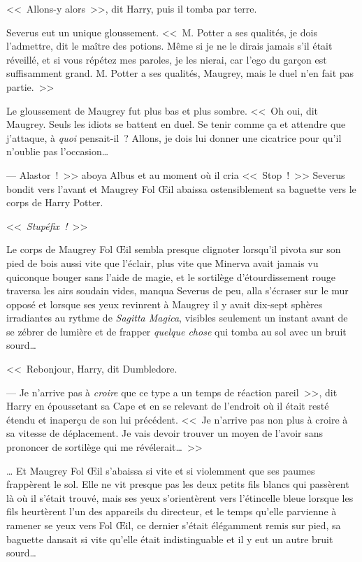 <<~Allons-y alors~>>, dit Harry, puis il tomba par terre.

Severus eut un unique gloussement. <<~M. Potter a ses qualités, je dois l'admettre, dit le maître des potions. Même si je ne le dirais jamais s'il était réveillé, et si vous répétez mes paroles, je les nierai, car l'ego du garçon est suffisamment grand. M. Potter a ses qualités, Maugrey, mais le duel n'en fait pas partie.~>>

Le gloussement de Maugrey fut plus bas et plus sombre. <<~Oh oui, dit Maugrey. Seuls les idiots se battent en duel. Se tenir comme ça et attendre que j'attaque, à \emph{quoi} pensait-il~? Allons, je dois lui donner une cicatrice pour qu'il n'oublie pas l'occasion…

--- Alastor~!~>> aboya Albus et au moment où il cria <<~Stop~!~>> Severus bondit vers l'avant et Maugrey Fol Œil abaissa ostensiblement sa baguette vers le corps de Harry Potter.

<<~\emph{Stupéfix~!}~>>

Le corps de Maugrey Fol Œil sembla presque clignoter lorsqu'il pivota sur son pied de bois aussi vite que l'éclair, plus vite que Minerva avait jamais vu quiconque bouger sans l'aide de magie, et le sortilège d'étourdissement rouge traversa les airs soudain vides, manqua Severus de peu, alla s'écraser sur le mur opposé et lorsque ses yeux revinrent à Maugrey il y avait dix-sept sphères irradiantes au rythme de \emph{Sagitta Magica}, visibles seulement un instant avant de se zébrer de lumière et de frapper \emph{quelque chose} qui tomba au sol avec un bruit sourd…

\later

<<~Rebonjour, Harry, dit Dumbledore.

--- Je n'arrive pas à \emph{croire} que ce type a un temps de réaction pareil~>>, dit Harry en époussetant sa Cape et en se relevant de l'endroit où il était resté étendu et inaperçu de son lui précédent. <<~Je n'arrive pas non plus à croire à sa vitesse de déplacement. Je vais devoir trouver un moyen de l'avoir sans prononcer de sortilège qui me révélerait…~>>

\later

… Et Maugrey Fol Œil s'abaissa si vite et si violemment que ses paumes frappèrent le sol. Elle ne vit presque pas les deux petits fils blancs qui passèrent là où il s'était trouvé, mais ses yeux s'orientèrent vers l'étincelle bleue lorsque les fils heurtèrent l'un des appareils du directeur, et le temps qu'elle parvienne à ramener se yeux vers Fol Œil, ce dernier s'était élégamment remis sur pied, sa baguette dansait si vite qu'elle était indistinguable et il y eut un autre bruit sourd…

